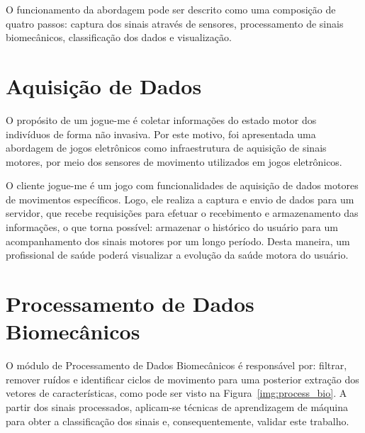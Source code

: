 
O funcionamento da abordagem pode ser descrito como uma composição de quatro passos: captura dos sinais através de sensores, processamento de sinais biomecânicos, classificação dos dados e visualização.

\section{Aquisição de Dados}
O propósito de um \ac{jogue-me} é coletar informações do estado motor dos indivíduos de forma não invasiva. Por este motivo, foi apresentada uma abordagem de jogos eletrônicos como infraestrutura de aquisição de sinais motores, por meio dos sensores de movimento utilizados em jogos eletrônicos.

O cliente \ac{jogue-me} é um jogo com funcionalidades de aquisição de dados motores de movimentos específicos. Logo, ele realiza a captura e envio de dados para um servidor, que recebe requisições para efetuar o recebimento e armazenamento das informações, o que torna possível: armazenar o histórico do usuário para um acompanhamento dos sinais motores por um longo período. Desta maneira, um profissional de saúde poderá visualizar a evolução da saúde motora do usuário.

\section{Processamento de Dados Biomecânicos}\label{sec:processador_bio}
O módulo de Processamento de Dados Biomecânicos é responsável por: filtrar, remover ruídos e identificar ciclos de movimento para uma posterior extração dos vetores de características, como pode ser visto na Figura~\ref{img:process_bio}. A partir dos sinais processados, aplicam-se técnicas de aprendizagem de máquina para obter a classificação dos sinais e, consequentemente, validar este trabalho.

